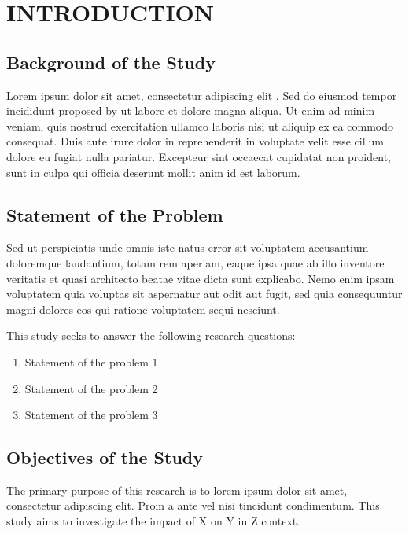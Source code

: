 \chapter{INTRODUCTION}

\section{Background of the Study}

Lorem ipsum dolor sit amet, consectetur adipiscing elit \parencite{placeholderArticle2023, placeholderConference2023}. Sed do eiusmod tempor incididunt proposed by \textcite{placeholderArticle2023} ut labore et dolore magna aliqua. Ut enim ad minim veniam, quis nostrud exercitation ullamco laboris nisi ut aliquip ex ea commodo consequat. Duis aute irure dolor in reprehenderit in voluptate velit esse cillum dolore eu fugiat nulla pariatur. Excepteur sint occaecat cupidatat non proident, sunt in culpa qui officia deserunt mollit anim id est laborum.

\section{Statement of the Problem}

Sed ut perspiciatis unde omnis iste natus error sit voluptatem accusantium doloremque laudantium, totam rem aperiam, eaque ipsa quae ab illo inventore veritatis et quasi architecto beatae vitae dicta sunt explicabo. Nemo enim ipsam voluptatem quia voluptas sit aspernatur aut odit aut fugit, sed quia consequuntur magni dolores eos qui ratione voluptatem sequi nesciunt.

This study seeks to answer the following research questions:

\begin{enumerate}
  \item Statement of the problem 1
  \item Statement of the problem 2
  \item Statement of the problem 3
\end{enumerate}

\section{Objectives of the Study}

The primary purpose of this research is to lorem ipsum dolor sit amet, consectetur adipiscing elit. Proin a ante vel nisi tincidunt condimentum. This study aims to investigate the impact of X on Y in Z context.

